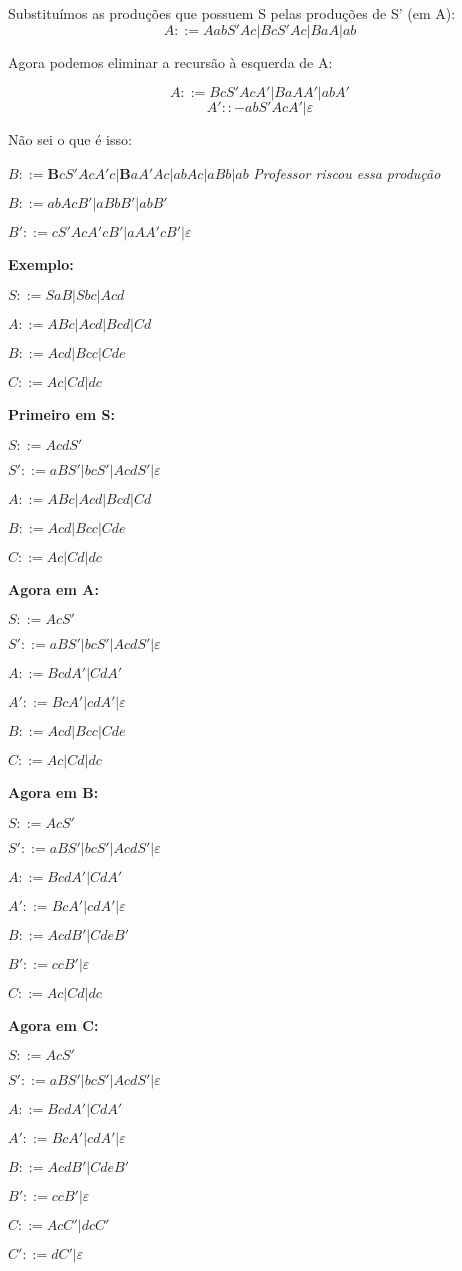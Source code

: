\documentclass[]{article}
\begin{document}
	Substituímos as produções que possuem S pelas produções de S' (em A):
	$$A::=AabS'Ac | BcS'Ac | BaA |ab$$
	
	Agora podemos eliminar a recursão à esquerda de A:
	
	$$A::= BcS'AcA' | BaAA' | abA'$$
	$$A'::- abS'AcA' | \varepsilon$$
	
	Não sei o que é isso:
	
	$B::= \textbf{B}cS'AcA'c|\textbf{B}aA'Ac | abAc | aBb | ab$ \textit{Professor riscou essa produção}
	
	$B::= abAcB' | aBbB' |abB'$
	
	$B'::= cS'AcA'cB' | aAA'cB'|\varepsilon$
	
\textbf{	Exemplo:}
	
	$S::= SaB | Sbc | Acd$
	
	$A::= ABc | Acd | Bcd | Cd$
	
	$B::= Acd | Bcc | Cde$
	
	$C::= Ac | Cd | dc$
	
\textbf{	Primeiro em S:}
	
	$S::= AcdS'$
	
	$S'::= aBS' | bcS' | AcdS' | \varepsilon$
		
	$A::= ABc | Acd | Bcd | Cd$
	
	$B::= Acd | Bcc | Cde$
	
	$C::= Ac | Cd | dc$
	
\textbf{	Agora em A:}
	
	$S::= AcS'$
	
	$S'::= aBS' | bcS' | AcdS' | \varepsilon$
	
	$A::= BcdA' | CdA'$
	
	$A'::= BcA' | cdA' | \varepsilon$
	
	$B::= Acd | Bcc | Cde$
	
	$C::= Ac | Cd | dc$
	
\textbf{	Agora em B:}
	
	$S::= AcS'$
	
	$S'::= aBS' | bcS' | AcdS' | \varepsilon$
	
	$A::= BcdA' | CdA'$
	
	$A'::= BcA' | cdA' | \varepsilon$
	
	$B::= AcdB' | CdeB'$
	
	$B'::= ccB' | \varepsilon$
	
	$C::= Ac | Cd | dc$
	
\textbf{	Agora em C:}

	$S::= AcS'$
	
	$S'::= aBS' | bcS' | AcdS' | \varepsilon$
	
	$A::= BcdA' | CdA'$
	
	$A'::= BcA' | cdA' | \varepsilon$
	
	$B::= AcdB' | CdeB'$
	
	$B'::= ccB' | \varepsilon$
	
	$C::= AcC' | dcC'$
	
	$C'::= dC' | \varepsilon$
	
\end{document}
